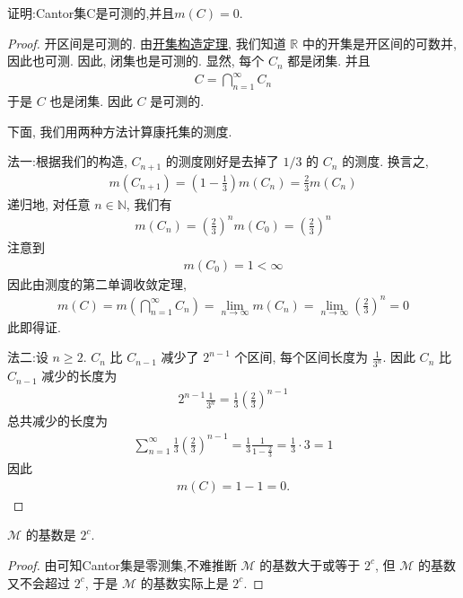 \documentclass[../../main.tex]{subfiles}
\begin{document}
\begin{proposition}\label{proposition:Cantor集可测且测度为0}
证明:Cantor集C是可测的,并且$m(C)=0$.
\end{proposition}
\begin{proof}
开区间是可测的. 由\hyperref[theorem:开集构造定理]{开集构造定理}, 我们知道 \(\mathbb{R}\) 中的开集是开区间的可数并, 因此也可测. 因此, 闭集也是可测的. 显然, 每个 \(C_n\) 都是闭集. 并且
\begin{align*}
C = \bigcap_{n = 1}^{\infty} C_n
\end{align*}
于是 \(C\) 也是闭集. 因此 \(C\) 是可测的.

下面, 我们用两种方法计算康托集的测度.

{\color{blue}法一:}根据我们的构造, \(C_{n + 1}\) 的测度刚好是去掉了 \(1/3\) 的 \(C_n\) 的测度. 换言之,
\begin{align*}
m(C_{n + 1}) = \left(1 - \frac{1}{3}\right)m(C_n) = \frac{2}{3}m(C_n)
\end{align*}
递归地, 对任意 \(n \in \mathbb{N}\), 我们有
\begin{align*}
m(C_n) = \left(\frac{2}{3}\right)^n m(C_0) = \left(\frac{2}{3}\right)^n
\end{align*}
注意到
\begin{align*}
m(C_0) = 1 < \infty
\end{align*}
因此由测度的第二单调收敛定理,
\begin{align*}
m(C) = m\left(\bigcap_{n = 1}^{\infty} C_n\right) = \lim_{n \to \infty} m(C_n) = \lim_{n \to \infty} \left(\frac{2}{3}\right)^n = 0
\end{align*}
此即得证.

{\color{blue}法二:}设 \(n \geq 2\). \(C_n\) 比 \(C_{n - 1}\) 减少了 \(2^{n - 1}\) 个区间, 每个区间长度为 \(\frac{1}{3^n}\). 因此 \(C_n\) 比 \(C_{n - 1}\) 减少的长度为
\begin{align*}
2^{n - 1}\frac{1}{3^n} = \frac{1}{3}\left(\frac{2}{3}\right)^{n - 1}
\end{align*}
总共减少的长度为
\begin{align*}
\sum_{n = 1}^{\infty} \frac{1}{3}\left(\frac{2}{3}\right)^{n - 1} = \frac{1}{3} \frac{1}{1 - \frac{2}{3}} = \frac{1}{3} \cdot 3 = 1
\end{align*}
因此
\begin{align*}
m(C) = 1 - 1 = 0.
\end{align*} 
\end{proof}

\begin{proposition}\label{proposition:可测集类的基数是2^c}
\(\mathscr{M}\) 的基数是 \(2^c\).
\end{proposition}
\begin{proof}
由可知Cantor集是零测集,不难推断 \(\mathscr{M}\) 的基数大于或等于 \(2^c\), 但 \(\mathscr{M}\) 的基数又不会超过 \(2^c\), 于是 \(\mathscr{M}\) 的基数实际上是 \(2^c\). 
\end{proof}
\end{document}
